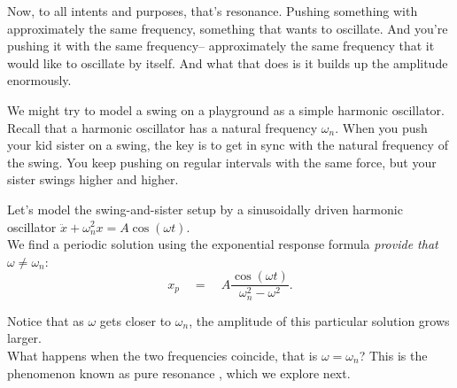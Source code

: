 Now, to all intents and purposes, that's resonance.
Pushing something with approximately the same frequency, something that wants to oscillate.
And you're pushing it with the same frequency-- approximately
the same frequency that it would like to oscillate by itself.
And what that does is it builds up the amplitude enormously.\\

\begin{example}
  We might try to model a swing on a playground as a simple harmonic oscillator.
  Recall that a harmonic oscillator has a natural frequency $\omega _n$.
  When you push your kid sister on a swing,
  the key is to get in sync with the natural frequency of the swing.
  You keep pushing on regular intervals with the same force, but your sister swings higher and higher.
\end{example}

Let's model the swing-and-sister setup by a sinusoidally driven harmonic oscillator
$\ddot{x}+\omega _ n^2x=A\cos (\omega t)$.\\
We find a periodic solution using the exponential response formula
\textit{provide that} $\omega \neq \omega _ n$:
\begin{equation*}
  \displaystyle x_p \quad
  \displaystyle = \quad
  \displaystyle A\frac{\cos (\omega t)}{\omega _ n^2-\omega ^2}.
\end{equation*}

Notice that as $\omega$ gets closer to $\omega_ n$,
the amplitude of this particular solution grows larger.\\

What happens when the two frequencies coincide,
that is $\omega = \omega _n$? This is the phenomenon known as pure resonance , which we explore next.



\clearpage
